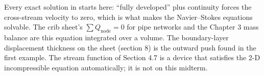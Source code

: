 \begin{hides}
Every exact solution in  starts here: ``fully developed'' plus continuity forces the cross-stream velocity to zero, which is what makes the Navier--Stokes equations solvable. The crib sheet's $\sum Q_{\text{node}} = 0$ for pipe networks and the Chapter 3 mass balance are this equation integrated over a volume. The boundary-layer displacement thickness on the sheet (section 8) is the outward push found in the first example. The stream function of Section 4.7 is a device that satisfies the 2-D incompressible equation automatically; it is not on this midterm.
\end{hides}
